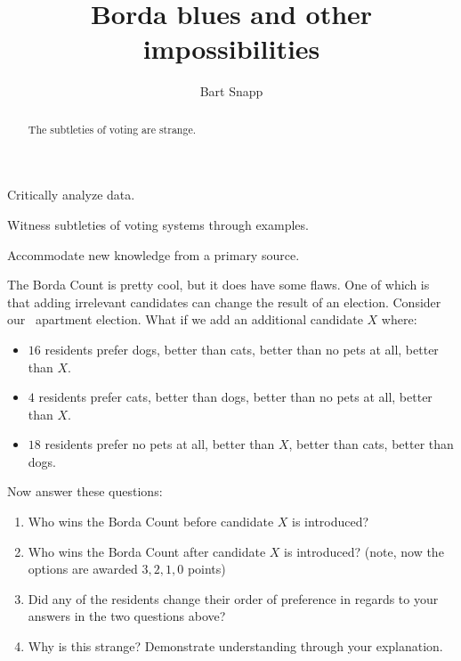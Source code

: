 \documentclass[nooutcomes,noauthor,hints,handout,12pt]{ximera}
\title{Borda blues and other impossibilities}
\author{Bart Snapp}
\begin{document}
\begin{abstract}
  The subtleties of voting are strange.
\end{abstract}
\maketitle

\begin{listOutcomes}
\item Critically analyze data.
\item Witness subtleties of voting systems through examples.
\item Accommodate new knowledge from a primary source. 
\end{listOutcomes}



\mynewpage

\begin{question}
The Borda Count is pretty cool, but it does have some flaws. One of
which is that adding irrelevant candidates can change the result of an
election. Consider our \mooculus~apartment election. What if we add an additional candidate $X$ where:

\begin{itemize}
\item $16$ residents prefer dogs, better than cats, better than no pets at all, better than $X$.
\item $4$ residents prefer cats, better than dogs, better than no pets at all, better than $X$.
\item $18$ residents prefer no pets at all, better than $X$, better than cats, better
  than dogs.
\end{itemize}
Now answer these questions:
\begin{enumerate}
\item Who wins the Borda Count before candidate $X$ is introduced?
\item Who wins the Borda Count after candidate $X$ is introduced? (note,
  now the options are awarded $3,2,1,0$ points)
\item Did any of the residents change their order of preference in
  regards to your answers in the two questions above?
\item Why is this strange? Demonstrate understanding through your
  explanation.
\end{enumerate}
\end{question}
\mynewpage
\end{document}
